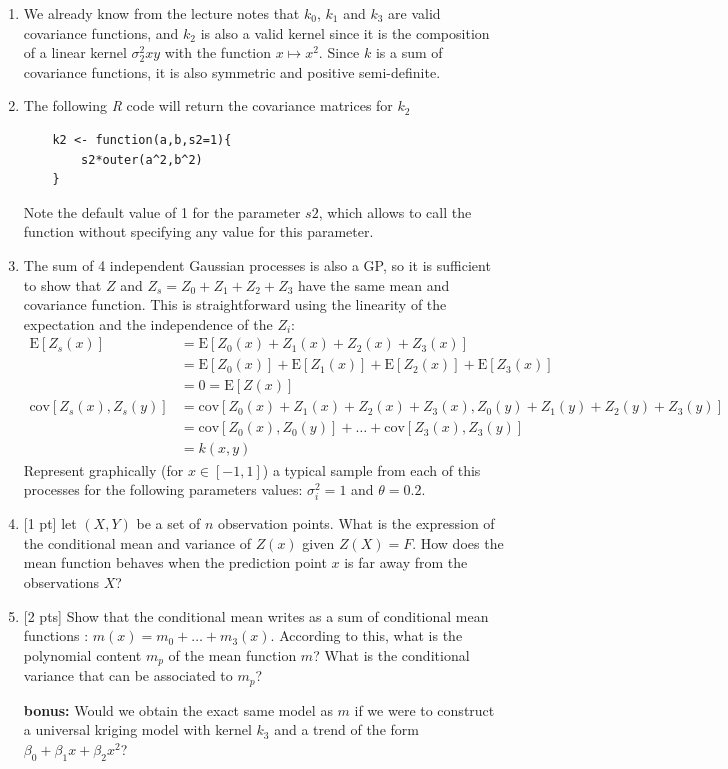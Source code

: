 \documentclass[a4paper,10pt]{article}
\newcommand{\E}{\mbox{E}}
\newcommand{\cov}{\mbox{cov}}
\begin{document}
\begin{enumerate}[label=Q\arabic*.]
\item  We already know from the lecture notes that $k_0$, $k_1$ and $k_3$ are valid covariance functions, and $k_2$ is also a valid kernel since it is the composition of a linear kernel $\sigma_2^2 xy$ with the function $x \mapsto x^2 $. Since $k$ is a sum of covariance functions, it is also symmetric and positive semi-definite.  
\item The following \emph{R} code will return the covariance matrices for $k_2$
\begin{Verbatim}
	k2 <- function(a,b,s2=1){
	    s2*outer(a^2,b^2)
	}
\end{Verbatim}
Note the default value of 1 for the parameter $s2$, which allows to call the function without specifying any value for this parameter.
\item The sum of 4 independent Gaussian processes is also a GP, so it is sufficient to show that $Z$ and $Z_s = Z_0+Z_1+Z_2+Z_3$ have the same mean and covariance function. This is straightforward using the linearity of the expectation and the independence of the $Z_i$:
\begin{align*}
\E [Z_s(x)] &= \E [Z_0(x) + Z_1(x) + Z_2(x) + Z_3(x)] \\
&= \E[Z_0(x)] + \E[Z_1(x)] + \E[Z_2(x)] + \E[Z_3(x)] \\
&= 0 = \E[Z(x)]\\
\cov [Z_s(x),Z_s(y)] &= \cov [ Z_0(x) + Z_1(x) + Z_2(x) + Z_3(x) , Z_0(y) + Z_1(y) + Z_2(y) + Z_3(y)]\\
&= \cov [Z_0(x),Z_0(y)] + \dots + \cov [Z_3(x),Z_3(y)]\\
&= k(x,y)
\end{align*}
Represent graphically (for $x \in [-1,1]$) a typical sample from each of this processes for the following parameters values: $\sigma_i^2 = 1$ and $\theta = 0.2$.
\item {[1 pt]} let $(X,Y)$ be a set of $n$ observation points. What is the expression of the conditional mean and variance of $Z(x)$ given $Z(X)=F$. How does the mean function behaves when the prediction point $x$ is far away from the observations $X$?
\item {[2 pts]} Show that the conditional mean writes as a sum of conditional mean functions : $m(x) = m_0 + \dots + m_3(x)$. According to this, what is the polynomial content $m_p$ of the mean function $m$? What is the conditional variance that can be associated to $m_p$?
\item[\textbf{bonus:}] Would we obtain the exact same model as $m$ if we were to construct a universal kriging model with kernel $k_3$ and a trend of the form $\beta_0 + \beta_1 x + \beta_2 x^2$?
\end{enumerate}
\end{document}

